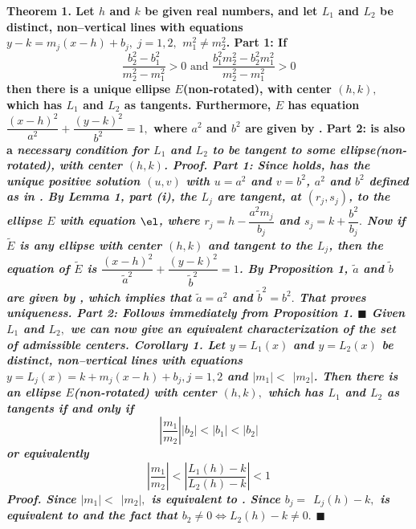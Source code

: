\nl \bf Theorem 1. \rm Let $h$ and $k$ be given real numbers, and let $L_{1}$ and $L_{2}$ be distinct, non--vertical lines with equations $y-k=m_{j}(x-h)+b_{j},\;j=1,2,$ $m_{1}^{2}\neq m_{2}^{2}$. \newline 
\bf Part 1: \rm If $$\dfrac{b_{2}^{2}-b_{1}^{2}}{m_{2}^{2}-m_{1}^{2}}>0\text{ and }\dfrac{b_{1}^{2}m_{2}^{2}-b_{2}^{2}m_{1}^{2}}{m_{2}^{2}-m_{1}^{2}}>0\tag{9}$$ then there is a unique ellipse $E$(non-rotated), with center $(h,k),$ which has $L_{1}$ and $L_{2}$ as tangents. Furthermore, $E$ has equation $\dfrac{(x-h)^{2}}{a^{2}}+\dfrac{(y-k)^{2}}{b^{2}}=1,$ where $a^{2}$ and $b^{2}$ are given by .  \newline 
\bf Part 2:  \rm {} is also a \it necessary \rm condition for $L_{1}$ and $L_{2}$ to be tangent to some ellipse(non-rotated), with center $(h,k)$. 
\nl \bf Proof. \rm Part 1: Since   holds,  has the unique positive solution $(u,v)$ with $u=a^{2}$ and $v=b^{2}$, $a^{2}$ and $b^{2}$ defined as in .  By Lemma 1, part (i), the $L_{j}$ are tangent, at $(r_{j},s_{j})$, to the ellipse $E$ with equation $\el$, where $r_{j}=h-\dfrac{a^{2}m_{j}}{b_{j}}$ and $s_{j}=k+\dfrac{b^{2}}{b_{j}}.$ Now if $\tilde{E}$ is \it any \rm ellipse with center $(h,k)$ and tangent to the $L_{j}$, then the equation of $\tilde{E}$ is $\dfrac{(x-h)^{2}}{\tilde{a}^{2}}+\dfrac{(y-k)^{2}}{\tilde{b}^{2}}=1$. By Proposition 1, $\tilde{a}$  and $\tilde{b}$ are given by , which implies that $\tilde{a}=a^{2}$ and $\tilde{b}^{2}=b^{2}.$ That proves uniqueness. \nl
Part 2: Follows immediately from Proposition 1. $\blacksquare$ \newline Given $L_{1}$ and $L_{2},$ we can now give an equivalent characterization of the set of admissible centers. \nl 
\nl \bf Corollary 1. \rm Let $y=L_{1}(x)$ and $y=L_{2}(x)$ be distinct, non--vertical lines with equations $y=L_{j}(x)=k+m_{j}(x-h)+b_{j},j=1,2$ and $\left| m_{1}\right| <$ $\left| m_{2}\right| $. Then there is an ellipse $E$(non-rotated) with center $(h,k),$ which has $L_{1}$ and $L_{2}$ as tangents if and only if 
$$\left| \dfrac{m_{1}}{m_{2}}\right| \left| b_{2}\right| <\left| b_{1}\right| <\left| b_{2}\right|\tag{10} $$\newline or equivalently $$\left| \dfrac{m_{1}}{m_{2}}\right| <\left| \dfrac{L_{1}(h)-k}{L_{2}(h)-k}\right| <1\tag{11}$$ 
\nl \bf Proof. \rm Since $\left| m_{1}\right| <$ $\left| m_{2}\right| ,$  is equivalent to . Since $b_{j}=$ $L_{j}(h)-k,$  is equivalent to  and the fact that $b_{2}\neq 0\Leftrightarrow L_{2}(h)-k\neq 0.$ $\blacksquare$ 
